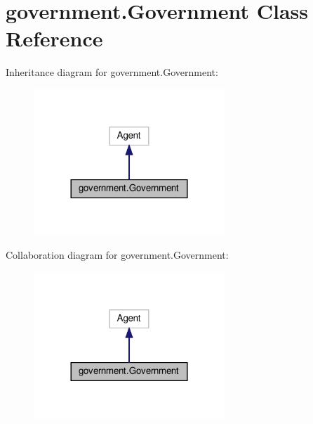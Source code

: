 \hypertarget{classgovernment_1_1Government}{}\section{government.\+Government Class Reference}
\label{classgovernment_1_1Government}


Inheritance diagram for government.\+Government\+:\nopagebreak
\begin{figure}[H]
\begin{center}
\leavevmode
\includegraphics[width=204pt]{classgovernment_1_1Government__inherit__graph}
\end{center}
\end{figure}


Collaboration diagram for government.\+Government\+:\nopagebreak
\begin{figure}[H]
\begin{center}
\leavevmode
\includegraphics[width=204pt]{classgovernment_1_1Government__coll__graph}
\end{center}
\end{figure}
